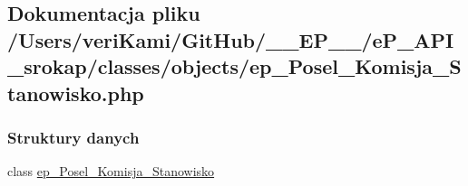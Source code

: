 \hypertarget{ep___posel___komisja___stanowisko_8php}{\subsection{Dokumentacja pliku /\-Users/veri\-Kami/\-Git\-Hub/\-\_\-\-\_\-\-E\-P\-\_\-\-\_\-/e\-P\-\_\-\-A\-P\-I\-\_\-srokap/classes/objects/ep\-\_\-\-Posel\-\_\-\-Komisja\-\_\-\-Stanowisko.php}
\label{ep___posel___komisja___stanowisko_8php}
}
\subsubsection*{Struktury danych}
\begin{DoxyCompactItemize}
\item 
class \hyperlink{classep___posel___komisja___stanowisko}{ep\-\_\-\-Posel\-\_\-\-Komisja\-\_\-\-Stanowisko}
\end{DoxyCompactItemize}
